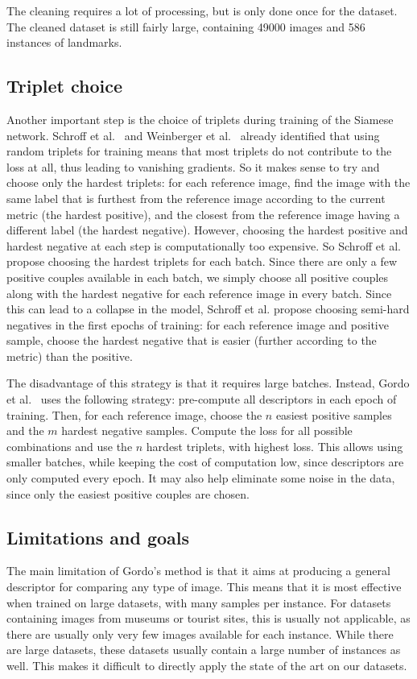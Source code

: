 The cleaning requires a lot of processing,
but is only done once for the dataset.
The cleaned dataset is still fairly large, containing 49000 images and
586 instances of landmarks.

\subsection{Triplet choice}
Another important step is the choice of triplets during training of
the Siamese network. Schroff et al.~\cite{schroff_facenet:_2015}
and Weinberger et al.~\cite{weinberger_distance_2006} already identified
that using random triplets for training means that most triplets do not
contribute to the loss at all, thus leading to vanishing gradients.
So it makes sense to try and choose only the hardest triplets: for each
reference image, find the image with the same label that is furthest from the
reference image according to the current metric (the hardest positive),
and the closest from the reference image having a different label
(the hardest negative).
However, choosing the hardest positive and hardest negative at each step
is computationally too expensive.
So Schroff et al.~\cite{schroff_facenet:_2015}
propose choosing the hardest triplets for each batch. Since there are only
a few positive couples available in each batch, we simply choose all
positive couples along with the hardest negative for each reference image
in every batch. Since this can lead to a collapse in the model, Schroff
et al. propose choosing semi-hard negatives in the first epochs of
training: for each reference image and positive sample, choose the hardest
negative that is easier (further according to the metric) than the positive.

The disadvantage of this strategy is that it requires large batches.
Instead, Gordo et al.~\cite{gordo_end--end_2016} uses the following
strategy: pre-compute all descriptors in each epoch of training.
Then, for each reference image, choose the $n$ easiest positive samples
and the $m$ hardest negative samples. Compute the loss for all possible
combinations and use the $n$ hardest triplets, with highest loss.
This allows using smaller batches, while keeping the cost of computation
low, since descriptors are only computed every epoch. It may also help
eliminate some noise in the data, since only the easiest positive couples
are chosen.

\subsection{Limitations and goals}\label{sec:limitations}
The main limitation of Gordo's method is that it aims at producing a
general descriptor for comparing any type of image. This means that it
is most effective when trained on large datasets, with many samples
per instance. For datasets containing images from museums or tourist
sites, this is usually not applicable, as there are usually only very few
images available for each instance. While there are large datasets,
these datasets usually contain a large number of instances as well.
This makes it difficult to directly apply the state of the art on
our datasets.


